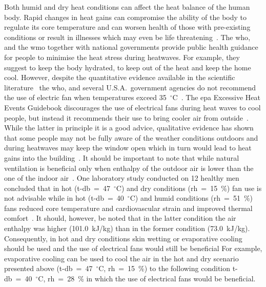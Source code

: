 Both humid and dry heat conditions can affect the heat balance of the human body.
Rapid changes in heat gains can compromise the ability of the body to regulate its core temperature and can worsen health of those with pre-existing conditions or result in illnesses which may even be life threatening~\cite{WMO2015}.
The \ac{who}, and the \ac{wmo} together with national governments provide public health guidance for people to minimise the heat stress during heatwaves.
For example, they suggest to keep the body hydrated, to keep out of the heat and keep the home cool.
However, despite the quantitative evidence available in the scientific literature~\cite{Jay2015, Jay2019a, Rate2015} the \ac{who}, and several U.S.A.\ government agencies do not recommend the use of electric fan when temperatures exceed 35~$^{\circ}$C~\cite{ExtremeH66:online, Frequent18:online, HeatandH28:online, WMO2015}.
The \ac{epa} Excessive Heat Events Guidebook discourages the use of electrical fans during heat waves to cool people, but instead it recommends their use to bring cooler air from outside~\cite{UnitedStatesEnvironmentalProtectionAgency2006}.
While the latter in principle it is a good advice, qualitative evidence has shown that some people may not be fully aware of the weather conditions outdoors and during heatwaves may keep the window open which in turn would lead to heat gains into the building~\cite{Tartarini2017}.
It should be important to note that while natural ventilation is beneficial only when enthalpy of the outdoor air is lower than the one of the indoor air~\cite{Fiorentini2019}.
One laboratory study conducted on 12 healthy men concluded that in hot (\ac{t-db}~=~47~$^{\circ}$C) and dry conditions (\ac{rh}~=~15~\%) fan use is not advisable while in hot (\ac{t-db}~=~40~$^{\circ}$C) and humid conditions (\ac{rh}~=~51~\%) fans reduced core temperature and cardiovascular strain and improved thermal comfort~\cite{Morris2019}.
It should, however, be noted that in the latter condition the air enthalpy was higher (101.0~kJ/kg) than in the former condition (73.0~kJ/kg).
Consequently, in hot and dry conditions skin wetting or evaporative cooling should be used and the use of electrical fans would still be beneficial
For example, evaporative cooling can be used to cool the air in the hot and dry scenario presented above (\ac{t-db}~=~47~$^{\circ}$C, \ac{rh}~=~15~\%) to the following condition \ac{t-db}~=~40~$^{\circ}$C, \ac{rh}~=~28~\% in which the use of electrical fans would be beneficial.


